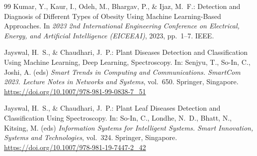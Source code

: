 \documentclass[12pt, a4paper]{article}
\begin{document}
\begin{thebibliography}{99}
Kumar, Y., Kaur, I., Odeh, M., Bhargav, P., \& Ijaz, M.~F.: Detection and Diagnosis of
Different Types of Obesity Using Machine Learning-Based Approaches. In \textit{2023 2nd
International Engineering Conference on Electrical, Energy, and Artificial Intelligence
(EICEEAI)}, 2023, pp.\ 1--7. IEEE.

Jayswal, H.~S., \& Chaudhari, J.~P.: Plant Diseases Detection and Classification Using
Machine Learning, Deep Learning, Spectroscopy. In: Senjyu, T., So-In, C., Joshi, A.
(eds) \textit{Smart Trends in Computing and Communications. SmartCom 2023. Lecture
Notes in Networks and Systems}, vol.\ 650. Springer, Singapore.
\url{https://doi.org/10.1007/978-981-99-0838-7_51}

Jayswal, H.~S., \& Chaudhari, J.~P.: Plant Leaf Diseases Detection and Classification
Using Spectroscopy. In: So-In, C., Londhe, N.~D., Bhatt, N., Kitsing, M. (eds)
\textit{Information Systems for Intelligent Systems. Smart Innovation, Systems and
Technologies}, vol.\ 324. Springer, Singapore.
\url{https://doi.org/10.1007/978-981-19-7447-2_42}

\end{thebibliography}
\end{document}
